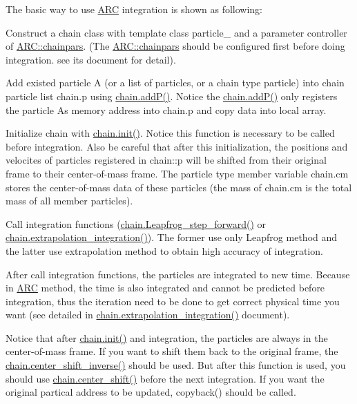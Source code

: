The basic way to use \hyperlink{namespaceARC}{A\+RC} integration is shown as following\+:
\begin{DoxyEnumerate}
\item Construct a chain class with template class particle\+\_\+ and a parameter controller of \hyperlink{classARC_1_1chainpars}{A\+R\+C\+::chainpars}. (The \hyperlink{classARC_1_1chainpars}{A\+R\+C\+::chainpars} should be configured first before doing integration. see its document for detail).
\item Add existed particle \textquotesingle{}A\textquotesingle{} (or a list of particles, or a chain type particle) into chain particle list chain.\+p using \hyperlink{classARC_1_1chain_a2df655cb46fcb7e892f196340e7d5c83}{chain.\+add\+P()}. Notice the \hyperlink{classARC_1_1chain_a2df655cb46fcb7e892f196340e7d5c83}{chain.\+add\+P()} only registers the particle A\textquotesingle{}s memory address into chain.\+p and copy data into local array.
\item Initialize chain with \hyperlink{classARC_1_1chain_a9ddc18539223abcb6451805abc15aea9}{chain.\+init()}. Notice this function is necessary to be called before integration. Also be careful that after this initialization, the positions and velocites of particles registered in chain\+::p will be shifted from their original frame to their center-\/of-\/mass frame. The particle type member variable chain.\+cm stores the center-\/of-\/mass data of these particles (the mass of chain.\+cm is the total mass of all member particles).
\item Call integration functions (\hyperlink{classARC_1_1chain_a0e375d50ca9a4c01f780dd5698fe6914}{chain.\+Leapfrog\+\_\+step\+\_\+forward()} or \hyperlink{classARC_1_1chain_acd19e23d46d38d66c5eb60a2e9afe727}{chain.\+extrapolation\+\_\+integration()}). The former use only Leapfrog method and the latter use extrapolation method to obtain high accuracy of integration.
\item After call integration functions, the particles are integrated to new time. Because in \hyperlink{namespaceARC}{A\+RC} method, the time is also integrated and cannot be predicted before integration, thus the iteration need to be done to get correct physical time you want (see detailed in \hyperlink{classARC_1_1chain_acd19e23d46d38d66c5eb60a2e9afe727}{chain.\+extrapolation\+\_\+integration()} document).
\item Notice that after \hyperlink{classARC_1_1chain_a9ddc18539223abcb6451805abc15aea9}{chain.\+init()} and integration, the particles are always in the center-\/of-\/mass frame. If you want to shift them back to the original frame, the \hyperlink{classARC_1_1chain_ab56fbddf27416cd640c535ec267cc4bc}{chain.\+center\+\_\+shift\+\_\+inverse()} should be used. But after this function is used, you should use \hyperlink{classARC_1_1chain_a2abf3aad903a354f29764ad7c8142ab6}{chain.\+center\+\_\+shift()} before the next integration. If you want the original partical address to be updated, copyback() should be called.
\end{DoxyEnumerate}

